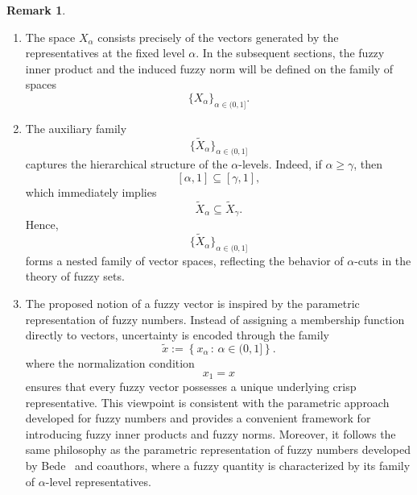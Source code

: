 \documentclass[preprint,12pt]{elsarticle}
\theoremstyle{definition}
\newtheorem{remark}{Remark}[section]
\begin{document}
 \begin{remark}
 	\begin{enumerate} \item The space $X_\alpha$ consists precisely of the vectors generated by the representatives at the fixed level $\alpha$. In the subsequent sections, the fuzzy inner product and the induced fuzzy norm will be defined on the family of spaces \[ \{X_\alpha\}_{\alpha\in(0,1]}. \] 
 		\item The auxiliary family \[ \{\widetilde{X}_\alpha\}_{\alpha\in(0,1]} \] captures the hierarchical structure of the $\alpha$-levels. Indeed, if $\alpha\ge\gamma$, then \[ [\alpha,1]\subseteq[\gamma,1], \] which immediately implies \[ \widetilde{X}_\alpha \subseteq \widetilde{X}_\gamma. \] Hence, \[ \{\widetilde{X}_\alpha\}_{\alpha\in(0,1]} \] forms a nested family of vector spaces, reflecting the behavior of $\alpha$-cuts in the theory of fuzzy sets.
 		 \item The proposed notion of a fuzzy vector is inspired by the parametric representation of fuzzy numbers. Instead of assigning a membership function directly to vectors, uncertainty is encoded through the family\[
 		 \tilde{x}:=\left\{x_\alpha\,:\,\alpha\in(0,1]\right\}.
 		 \] where the normalization condition \[ x_1=x \] ensures that every fuzzy vector possesses a unique underlying crisp representative. This viewpoint is consistent with the parametric approach developed for fuzzy numbers and provides a convenient framework for introducing fuzzy inner products and fuzzy norms. Moreover, it follows the same philosophy as the parametric representation of fuzzy numbers developed by Bede~\cite{BedeStefanini2006} and coauthors, where a fuzzy quantity is characterized by its family of $\alpha$-level representatives.
 		 
 		 
  \end{enumerate} \end{remark}
\end{document}
